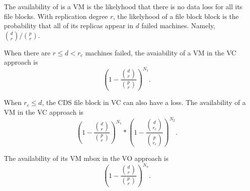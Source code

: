 The availability of is a VM is the likelyhood that
there is no  data loss for all its file blocks.
With replication degree $r$, the likelyhood of
a file block block is the probability that  
all of its replicas appear in $d$ failed machines. 
Namely, $\binom{d}{r}/ \binom{p}{r}$.


When there are $r \le d<r_c$ machines failed, 
the avaiability of a VM in the VC approach is
\[
(1-\frac{\binom{d}{r}} { \binom{p}{r} })^{N_1}.
\]

When $r_c \leq d$, the CDS file block in VC can also have a loss.
The availability of  a VM in the VC approach is
\[
(1-\frac{ \binom{d}{r}} { \binom{p}{r} })^{N_1} 
*
(1-\frac{ \binom{d}{r_c}} { \binom{p}{r_c} })^{N_2}.
\]

The availability of its VM  mbox in the VO approach is
\[ 
(1-\frac{ \binom{d}{r}} { \binom{p}{r} })^{N_o}. 
\]





